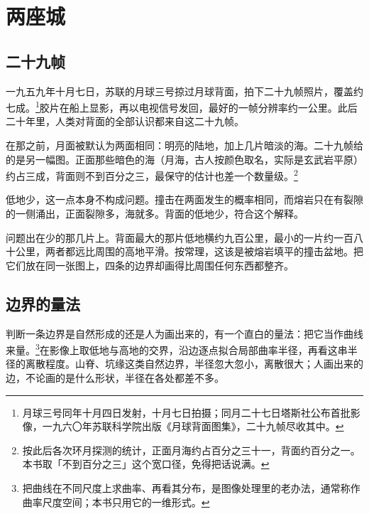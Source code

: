 \chapter{两座城}


\section{二十九帧}

一九五九年十月七日，苏联的月球三号掠过月球背面，拍下二十九帧照片，覆盖约七成。\footnote{月球三号同年十月四日发射，十月七日拍摄；同月二十七日塔斯社公布首批影像，一九六〇年苏联科学院出版《月球背面图集》，二十九帧尽收其中。}胶片在船上显影，再以电视信号发回，最好的一帧分辨率约一公里。此后二十年里，人类对背面的全部认识都来自这二十九帧。

在那之前，月面被默认为两面相同：明亮的陆地，加上几片暗淡的海。二十九帧给的是另一幅图。正面那些暗色的海（月海，古人按颜色取名，实际是玄武岩平原）约占三成，背面则不到百分之三，最保守的估计也差一个数量级。\footnote{按此后各次环月探测的统计，正面月海约占百分之三十一，背面约百分之一。本书取「不到百分之三」这个宽口径，免得把话说满。}

低地少，这一点本身不构成问题。撞击在两面发生的概率相同，而熔岩只在有裂隙的一侧涌出，正面裂隙多，海就多。背面的低地少，符合这个解释。

问题出在少的那几片上。背面最大的那片低地横约九百公里，最小的一片约一百八十公里，两者都远比周围的高地平滑。按常理，这该是被熔岩填平的撞击盆地。把它们放在同一张图上，四条的边界却画得比周围任何东西都整齐。


\section{边界的量法}

判断一条边界是自然形成的还是人为画出来的，有一个直白的量法：把它当作曲线来量。\footnote{把曲线在不同尺度上求曲率、再看其分布，是图像处理里的老办法，通常称作曲率尺度空间；本书只用它的一维形式。}在影像上取低地与高地的交界，沿边逐点拟合局部曲率半径，再看这串半径的离散程度。山脊、坑缘这类自然边界，半径忽大忽小，离散很大；人画出来的边，不论画的是什么形状，半径在各处都差不多。

